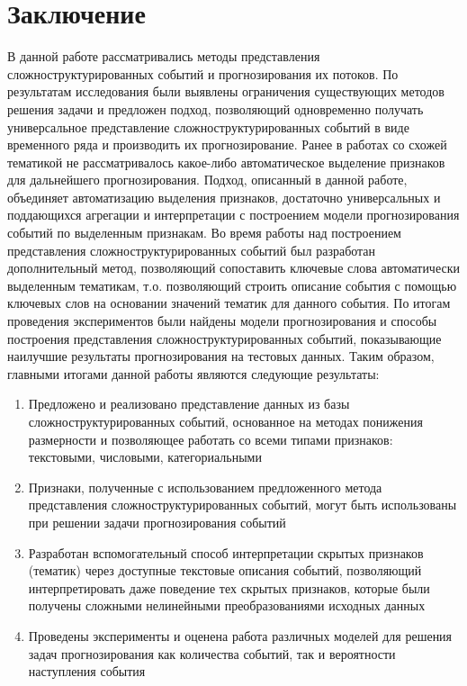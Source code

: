 \section{Заключение}
В данной работе рассматривались методы представления сложноструктурированных событий и прогнозирования их потоков. По результатам исследования были выявлены ограничения существующих методов решения задачи и предложен подход, позволяющий одновременно получать универсальное представление сложноструктурированных событий в виде временного ряда и производить их прогнозирование.
Ранее в работах со схожей тематикой не рассматривалось какое-либо автоматическое выделение признаков для дальнейшего прогнозирования. Подход, описанный в данной работе, объединяет автоматизацию выделения признаков, достаточно универсальных и поддающихся агрегации и интерпретации с построением модели прогнозирования событий по выделенным признакам.
Во время работы над построением представления сложноструктурированных событий был разработан дополнительный метод, позволяющий сопоставить ключевые слова автоматически выделенным тематикам, т.о. позволяющий строить описание события с помощью ключевых слов на основании значений тематик для данного события.
По итогам проведения экспериментов были найдены модели прогнозирования и способы построения представления сложноструктурированных событий, показывающие наилучшие результаты прогнозирования на тестовых данных.
Таким образом, главными итогами данной  работы являются следующие результаты:
\begin{enumerate}
    \item Предложено и реализовано представление данных из базы сложноструктурированных событий, основанное на методах понижения размерности и позволяющее работать со всеми типами признаков: текстовыми, числовыми, категориальными
    \item Признаки, полученные с использованием предложенного метода представления сложноструктурированных событий, могут быть использованы при решении задачи прогнозирования событий
    \item Разработан вспомогательный способ интерпретации скрытых признаков (тематик) через доступные текстовые описания событий, позволяющий интерпретировать даже поведение тех скрытых признаков, которые были получены сложными нелинейными преобразованиями исходных данных
    \item Проведены эксперименты и оценена работа различных моделей для решения задач прогнозирования как количества событий, так и вероятности наступления события

\end{enumerate}